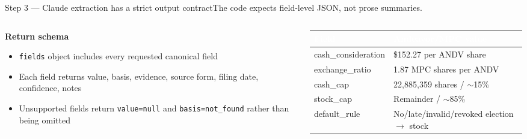 \documentclass[aspectratio=169,10pt]{beamer}
\newcommand{\hdr}[1]{\textcolor{white}{\normalfont\bfseries #1}}
\begin{document}
\begin{frame}{Step 3 --- Claude extraction has a strict output contract}{The code expects field-level JSON, not prose summaries.}
  \begin{columns}[T]
    \begin{column}{0.45\textwidth}
      {\bfseries\color{navy}Return schema}
      \begin{itemize}\small
        \item \texttt{fields} object includes every requested canonical field
        \item Each field returns value, basis, evidence, source form, filing date, confidence, notes
        \item Unsupported fields return \texttt{value=null} and \texttt{basis=not\_found} rather than being omitted
      \end{itemize}
    \end{column}
    \begin{column}{0.53\textwidth}
      {\small
      \begin{tabularx}{\linewidth}{@{}>{\ttfamily}p{2.9cm} X@{}}
        \rowcolor{navy}\hdr{Field} & \hdr{Andeavor/MPC value}\\ \midrule
        cash\_consideration & \$152.27 per ANDV share\\
        exchange\_ratio & 1.87 MPC shares per ANDV\\
        cash\_cap & 22,885,359 shares / $\sim$15\%\\
        stock\_cap & Remainder / $\sim$85\%\\
        default\_rule & No/late/invalid/revoked election \(\rightarrow\) stock\\
      \end{tabularx}}
    \end{column}
  \end{columns}
\end{frame}
\end{document}
